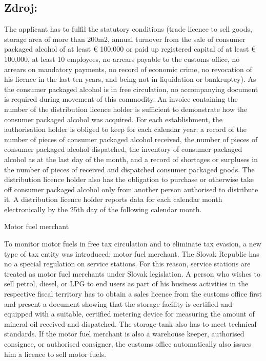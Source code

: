 \documentclass[10pt]{article}
\begin{document}
\subsection*{Zdroj:}

The applicant has to fulfil the statutory conditions (trade licence to sell goods, storage area of more than 200m2, annual turnover from the sale of consumer packaged alcohol of at least € 100,000 or paid up registered capital of at least € 100,000, at least 10 employees, no arrears payable to the customs office, no arrears on mandatory payments, no record of economic crime, no revocation of his licence in the last ten years, and being not in liquidation or bankruptcy).
As the consumer packaged alcohol is in free circulation, no accompanying document is required during movement of this commodity.
An invoice containing the number of the distribution licence holder is sufficient to demonstrate how the consumer packaged alcohol was acquired.
For each establishment, the authorisation holder is obliged to keep for each calendar year: a record of the number of pieces of consumer packaged alcohol received, the number of pieces of consumer packaged alcohol dispatched, the inventory of consumer packaged alcohol as at the last day of the month, and a record of shortages or surpluses in the number of pieces of received and dispatched consumer packaged goods.
The distribution licence holder also has the obligation to purchase or otherwise take off consumer packaged alcohol only from another person authorised to distribute it.
A distribution licence holder reports data for each calendar month electronically by the 25th day of the following calendar month.


Motor fuel merchant

To monitor motor fuels in free tax circulation and to eliminate tax evasion, a new type of tax entity was introduced: motor fuel merchant.
The Slovak Republic has no a special regulation on service stations.
For this reason, service stations are treated as motor fuel merchants under Slovak legislation.
A person who wishes to sell petrol, diesel, or LPG to end users as part of his business activities in the respective fiscal territory has to obtain a sales licence from the customs office first and present a document showing that the storage facility is certified and equipped with a suitable, certified metering device for measuring the amount of mineral oil received and dispatched. The storage tank also has to meet technical standards.
If the motor fuel merchant is also a warehouse keeper, authorised consignee, or authorised consigner, the customs office automatically also issues him a licence to sell motor fuels.
\end{document}
